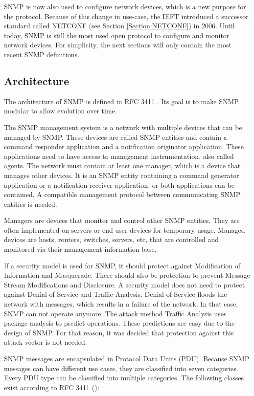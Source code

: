 SNMP is now also used to configure network devices, which is a new purpose for the protocol. Because of this change in use-case, the IEFT introduced a successor standard called NETCONF (see Section \ref{Section:NETCONF}) in 2006. 
Until today, SNMP is still the most used open protocol to configure and monitor network devices. For simplicity, the next sections will only contain the most recent SNMP definitions.

\subsection{Architecture}
The architecture of SNMP is defined in RFC 3411 \cite{RFC:RFC3411:2002}. Its goal is to make SNMP modular to allow evolution over time.

The SNMP management system is a network with multiple devices that can be managed by SNMP. These devices are called SNMP entities and contain a command responder application and a notification originator application. These applications need to have access to management instrumentation, also called agents. The network must contain at least one manager, which is a device that manages other devices. It is an SNMP entity containing a command generator application or a notification receiver application, or both applications can be contained. A compatible management protocol between communicating SNMP entities is needed.

Managers are devices that monitor and control other SNMP entities. They are often implemented on servers or end-user devices for temporary usage. Managed devices are hosts, routers, switches, servers, etc, that are controlled and monitored via their management information base.

\newpage
If a security model is used for SNMP, it should protect against Modification of Information and Masquerade. There should also be protection to prevent Message Stream Modifications and Disclosure. A security model does not need to protect against Denial of Service and Traffic Analysis. Denial of Service floods the network with messages, which results in a failure of the network. In that case, SNMP can not operate anymore. The attack method Traffic Analysis uses package analysis to predict operations. These predictions are easy due to the design of SNMP. For that reason, it was decided that protection against this attack vector is not needed.

SNMP messages are encapsulated in Protocol Data Units (PDU). Because SNMP messages can have different use cases, they are classified into seven categories. Every PDU type can be classified into multiple categories. The following classes exist according to RFC 3411 (\cite{RFC:RFC3411:2002}):

